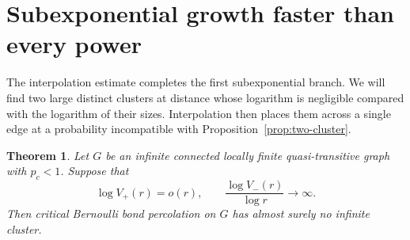 \documentclass[11pt]{article}
\newtheorem{theorem}{Theorem}[section]
\theoremstyle{definition}
\begin{document}
\section{Subexponential growth faster than every power}
\label{sec:superpolynomial}

The interpolation estimate completes the first subexponential branch.
We will find two large distinct clusters at distance whose logarithm
is negligible compared with the logarithm of their sizes. Interpolation
then places them across a single edge at a probability incompatible
with Proposition~\ref{prop:two-cluster}.

\begin{theorem}\label{thm:superpoly}
Let $G$ be an infinite connected locally finite quasi-transitive graph
with $p_c<1$. Suppose that
\[
 \log V_+(r)=o(r),
 \qquad \frac{\log V_-(r)}{\log r}\longrightarrow\infty.
\]
Then critical Bernoulli bond percolation on $G$ has almost surely no
infinite cluster.
\end{theorem}
\end{document}
